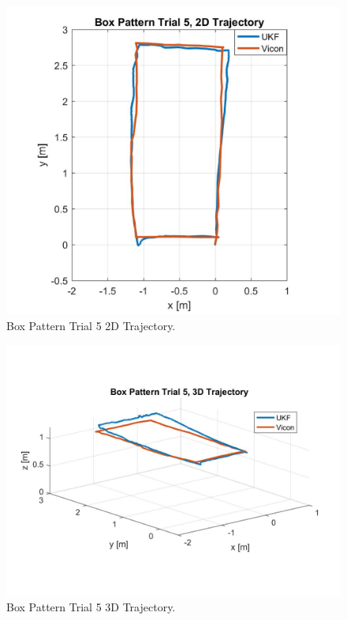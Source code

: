 \begin{figure}[p]
  \centering
    \includegraphics[height=0.4\textheight]{box5_2d}
  \caption[Box Pattern Trial 5 2D Trajectory]{Box Pattern Trial 5 2D Trajectory.}
  \label{fig:box5_2d}
\end{figure}
\begin{figure}[p]
  \centering
    \includegraphics[height=0.4\textheight]{box5_3d}
  \caption[Box Pattern Trial 5 3D Trajectory]{Box Pattern Trial 5 3D Trajectory.}
  \label{fig:box5_3d}
\end{figure}
\clearpage

